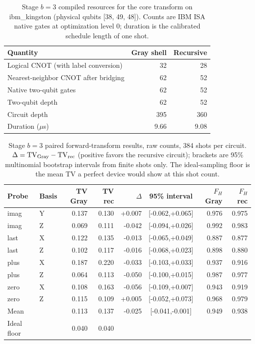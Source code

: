 \begin{table}[htbp]\centering\small
\caption{Stage $b=3$ compiled resources for the core transform on ibm\_kingston (physical qubits [38, 49, 48]). Counts are IBM ISA native gates at optimization level 0; duration is the calibrated schedule length of one shot.}
\label{tab:hw-res-b3}\begin{tabular}{lrr}\toprule Quantity & Gray shell & Recursive\\\midrule
Logical CNOT (with label conversion) & 32 & 28\\
Nearest-neighbor CNOT after bridging & 62 & 52\\
Native two-qubit gates & 62 & 52\\
Two-qubit depth & 62 & 52\\
Circuit depth & 395 & 360\\
Duration ($\mu$s) & 9.66 & 9.08\\
\bottomrule\end{tabular}\end{table}

\begin{table}[htbp]\centering\small
\caption{Stage $b=3$ paired forward-transform results, raw counts, 384 shots per circuit. $\Delta=\mathrm{TV}_{\rm Gray}-\mathrm{TV}_{\rm rec}$ (positive favors the recursive circuit); brackets are 95\% multinomial bootstrap intervals from finite shots only. The ideal-sampling floor is the mean TV a perfect device would show at this shot count.}
\label{tab:hw-pairs-b3}\begin{tabular}{llrrrcrr}\toprule Probe & Basis & TV Gray & TV rec & $\Delta$ & 95\% interval & $F_H$ Gray & $F_H$ rec\\\midrule
imag & Y & 0.137 & 0.130 & +0.007 & [-0.062,+0.065] & 0.976 & 0.975\\
imag & Z & 0.069 & 0.111 & -0.042 & [-0.094,+0.026] & 0.992 & 0.983\\
last & X & 0.122 & 0.135 & -0.013 & [-0.065,+0.049] & 0.887 & 0.877\\
last & Z & 0.102 & 0.117 & -0.016 & [-0.068,+0.023] & 0.898 & 0.880\\
plus & X & 0.187 & 0.220 & -0.033 & [-0.103,+0.033] & 0.937 & 0.916\\
plus & Z & 0.064 & 0.113 & -0.050 & [-0.100,+0.015] & 0.987 & 0.977\\
zero & X & 0.108 & 0.163 & -0.056 & [-0.109,+0.007] & 0.943 & 0.919\\
zero & Z & 0.115 & 0.109 & +0.005 & [-0.052,+0.073] & 0.968 & 0.979\\
\midrule
Mean & & 0.113 & 0.137 & -0.025 & [-0.041,-0.001] & 0.949 & 0.938\\
Ideal floor & & 0.040 & 0.040 & & & &\\
\bottomrule\end{tabular}\end{table}

